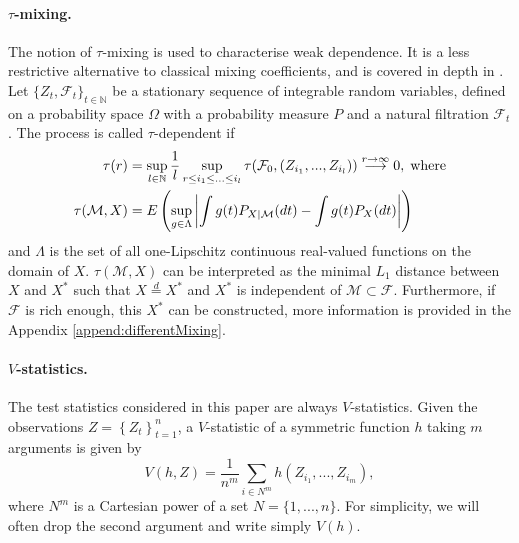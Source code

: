 \paragraph{$\tau$-mixing.} The notion of $\tau$-mixing is used to characterise weak dependence. It is a less restrictive alternative to classical mixing coefficients, and is covered in depth in \cite{dedecker2007weak}. Let $\{Z_t,\mathcal{F}_t\}_{t \in \mathbb{N}}$  be a stationary sequence of integrable random variables, defined on a probability space $\Omega$ with a probability measure $P$ and a natural filtration $\mathcal{F}_t$. The process  is called $\tau$-dependent if 
\begin{align*}
\tau(r) &= \sup_{l \in \mathbb{N}} \frac 1 l \sup_{ r \leq i_1 \leq ... \leq i_l} \tau( \mathcal F_0,(Z_{i_1},...,Z_{i_l}) )  \overset{r \to \infty}{\longrightarrow} 0,\;\text{where} \\
\tau(\mathcal{M},X) &=  E \left( \sup_{g \in \Lambda} \left| \int g(t) P_{X|\mathcal{M}}(dt) - \int g(t) P_X(dt) \right| \right)
\end{align*}
and $\Lambda$ is the set of all one-Lipschitz continuous real-valued functions on the domain of $X$. $\tau(\mathcal M,X)$ can be interpreted as the minimal $L_1$ distance between $X$ and $X^*$ such that $X \overset{d}{=}X^*$ and $X^*$ is independent of $\mathcal M \subset \mathcal F$. Furthermore, if $\mathcal F$ is rich enough, this $X^*$ can be constructed, more information is provided in the Appendix \ref{append:differentMixing}.

%  
\paragraph{$V$-statistics.} The test statistics considered in this paper are always $V$-statistics. Given the observations $Z=\left\{Z_t\right\}_{t=1}^n$, a $V$-statistic of a symmetric function $h$ taking $m$ arguments is given by 
\begin{equation}
\label{def:Vstat}
V(h,Z) = \frac{1}{n^m} \sum_{i \in N^m} \nolimits h(Z_{i_1},...,Z_{i_m}),
\end{equation}
where $N^m$ is a Cartesian power of a set $N= \{1,...,n\}$. For simplicity, we will often drop the second argument and write simply $V(h)$. 

